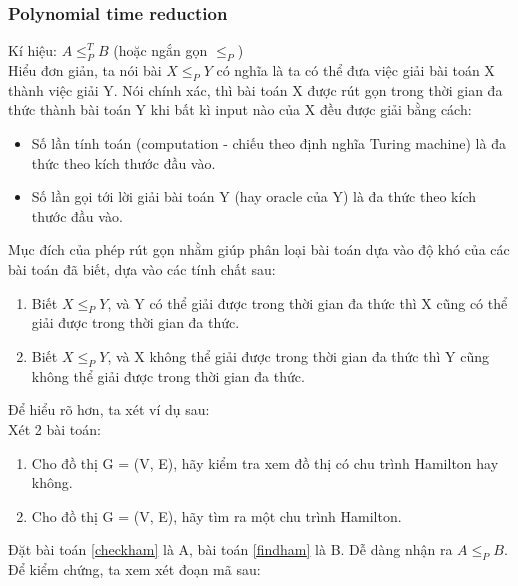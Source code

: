 \documentclass[a4paper 14pt]{article}
\begin{document}
			\subsubsection{Polynomial time reduction}
				Kí hiệu: $A \leq_P^T B$ (hoặc ngắn gọn $\leq_P$)\\
				Hiểu đơn giản, ta nói bài $X \leq_P Y$ có nghĩa là ta có thể đưa việc giải bài toán X thành việc giải Y. Nói chính xác, thì bài toán X được rút gọn trong thời gian đa thức thành bài toán Y khi bất kì input nào của X đều được giải bằng cách:\\
				\begin{itemize}
					\item Số lần tính toán (computation - chiếu theo định nghĩa Turing machine) là đa thức theo kích thước đầu vào.
					\item Số lần gọi tới lời giải bài toán Y (hay oracle của Y) là đa thức theo kích thước đầu vào.
				\end{itemize}
				Mục đích của phép rút gọn nhằm giúp phân loại bài toán dựa vào độ khó của các bài toán đã biết, dựa vào các tính chất sau:
				\begin{enumerate}
					\item Biết $X \leq_P Y$, và Y có thể giải được trong thời gian đa thức thì X cũng có thể giải được trong thời gian đa thức.
					\item Biết $X \leq_P Y$, và X không thể giải được trong thời gian đa thức thì Y cũng không thể giải được trong thời gian đa thức.
				\end{enumerate}
				Để hiểu rõ hơn, ta xét ví dụ sau:\\
				Xét 2 bài toán:
				\begin{enumerate}
					\item\label{checkham} Cho đồ thị G = (V, E), hãy kiểm tra xem đồ thị có chu trình Hamilton hay không.
					\item\label{findham} Cho đồ thị G = (V, E), hãy tìm ra một chu trình Hamilton.
				\end{enumerate}
				Đặt bài toán \ref{checkham} là A, bài toán \ref{findham} là B. Dễ dàng nhận ra $A \leq_P B$. Để kiểm chứng, ta xem xét đoạn mã sau:
				
\end{document}
